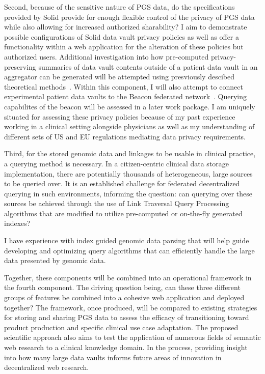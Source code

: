\documentclass[a4paper,11pt]{article}
\begin{document}
\begin{refsection}
Second, because of the sensitive nature of PGS data, do the specifications provided by Solid provide for enough flexible control of the privacy of PGS data while also allowing for increased authorized sharability?
I aim to demonstrate possible configurations of Solid data vault privacy policies as well as offer a functionality within a web application for the alteration of these policies but authorized users.
Additional investigation into how pre-computed privacy-preserving summaries of data vault contents outside of a patient data vault in an aggregator can be generated will be attempted using presviously descibed theoretical methods~\cite{taelman_privacyAgg_2020}.
Within this component, I will also attempt to connect experimental patient data vaults to the Beacon federated network~\cite{rambla_beacon_2022}.
Querying capabilites of the beacon will be assessed in a later work package.
I am uniquely situated for assessing these privacy policies because of my past experience working in a clinical setting alongside physicians as well as my understanding of different sets of US and EU regulations mediating data privacy requirements.

Third, for the stored genomic data and linkages to be usable in clinical practice, a querying method is necessary.
In a citizen-centric clinical data storage implementation, there are potentially thousands of heterogeneous, large sources to be queried over.
It is an established challenge for federated decentralized querying in such environments, %
informing the question: can querying over these sources be achieved through the use of Link Traversal Query Processing algorithms that are modified to utilize pre-computed or on-the-fly generated indexes?


I have experience with index guided genomic data parsing that will help guide developing and optimizing query algorithms that can efficiently handle the large data presented by genomic data. 

Together, these components will be combined into an operational framework in the fourth component. 
The driving question being, can these three different groups of features be combined into a cohesive web application and deployed together?
The framework, once produced, will be compared to existing strategies for storing and sharing PGS data to assess the efficacy of transitioning toward product production and specific clinical use case adaptation.
The proposed scientific approach also aims to test the application of numerous fields of semantic web research to a clinical knowledge domain. 
In the process, providing insight into how many large data vaults informs future areas of innovation in decentralized web research.


\end{refsection}
\end{document}
